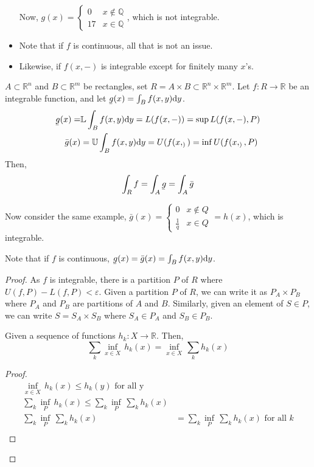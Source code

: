 \documentclass[a4paper]{article}
\newcommand{\ubar}[1]{\underaccent{\bar}{#1}}
\numberwithin{equation}{section}
\newcommand{\R}{\mathbb{R}}
\begin{document}
\begin{itemize}
    Now, $g(x)=\begin{cases}
        0 & x\notin\mathbb Q\\
        17 & x\in\mathbb Q
    \end{cases}$, which is not integrable.

    \item Note that if $f$ is continuous, all that is not an issue.
    \item Likewise, if $f(x,-)$ is integrable except for finitely many $x$'s.
\end{itemize}
\begin{theorem}[Fubini's]
    $A\subset\R^n$ and $B\subset\R^m$ be rectangles, set $R=A\times B\subset\R^n\times\R^m$. Let $f:R\to\R$ be an integrable function, and let $\ubar{g}(x)=\int_B f(x,y)\dd y$. 
    \begin{align}
        \ubar{g}(x)=&\mathbb L\int_Bf(x,y)\dd y=L(f(x,-))=\sup L(f(x,-), P)\\
        \bar{g}(x)&=\mathbb U\int_Bf(x,y)\dd y=U(f(x,_))=\inf U(f(x,_), P)\\
    \end{align}
    Then,\begin{equation}
        \int_Rf=\int_A\ubar g=\int_A\bar g
    \end{equation}

    Now consider the same example, $\bar{g}(x)=\begin{cases}
        0 & x\notin Q\\
        \frac{1}{q} & x\in Q
    \end{cases}=h(x)$, which is integrable.

    Note that if $f$ is continuous, $\ubar{g}(x)=\bar{g}(x)=\int_Bf(x,y)\dd y$.

    \begin{proof}
        As $f$ is integrable, there is a partition $P$ of $R$ where $U(f,P)-L(f,P)<\varepsilon$.
        Given a partition $P$ of $R$, we can write it as $P_A\times P_B$ where $P_A$ and $P_B$ are partitions of $A$ and $B$. Similarly, given an element of $S\in P$, we can write $S=S_A\times S_B$ where $S_A\in P_A$ and $S_B\in P_B$.
    

        \begin{lemma}
        Given a sequence of functions $h_k:X\to\R$. Then,
        \begin{equation}
            \sum_k\inf_{x\in X}\,h_k(x)=\inf_{x\in X}\,\sum_kh_k(x)
        \end{equation}
        \begin{proof} 
            \begin{align}    
                \inf_{x\in X}\,h_k(x)\leq h_k(y)\text{ for all y}  \\          
                \sum_k\inf_P\,h_k(x)\leq \sum_k\inf_P\,\sum_kh_k(x)\\
                \sum_k\inf_P\,\sum_kh_k(x)&=\sum_k\inf_P\,\sum_kh_k(x)\text{ for all $k$}\\
            \end{align}
        \end{proof}
        \end{lemma}


\end{proof}
\end{theorem}
\end{document}
